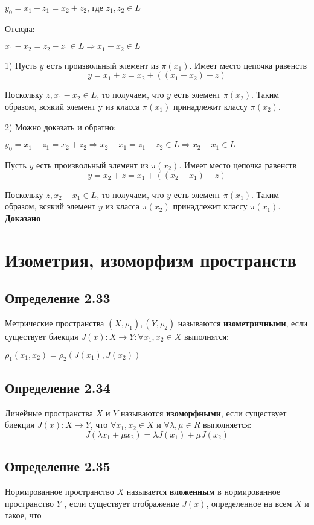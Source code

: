 \documentclass[12pt]{article}
\begin{document}
 	$y_0 = x_1 + z_1 = x_2 + z_2$, где $z_1, z_2 \in L$
 	
 	Отсюда:
 	
 	$x_1 - x_2 = z_2 - z_1 \in L	 \Rightarrow x_1 - x_2 \in L$
	
	 1) Пусть $y$ есть произвольный элемент из $\pi(x_1)$. Имеет место цепочка равенств
	  $$y = x_1 + z = x_2 + ((x_1 - x_2) + z) $$

Поскольку $z, x_1 - x_2 \in L$, то получаем, что $y$ есть элемент $\pi(x_2)$. 
Таким образом, всякий элемент y из класса $\pi(x_1)$ принадлежит классу $\pi(x_2)$.

	2) Можно доказать и обратно:

	$y_0 = x_1 + z_1 = x_2 + z_2 \Rightarrow x_2 - x_1 = z_1 - z_2 \in L	\Rightarrow x_2 - x_1 \in L$
	
		 Пусть $y$ есть произвольный элемент из $\pi(x_2)$. Имеет место цепочка равенств
	  $$y = x_2 + z = x_1 + ((x_2 - x_1) + z) $$
	
Поскольку $z, x_2 - x_1 \in L$, то получаем, что $y$ есть элемент $\pi(x_1)$. 
Таким образом, всякий элемент $y$ из класса $\pi(x_2)$ принадлежит классу $\pi(x_1)$.	
	\textbf{Доказано}
	
	
	
\newpage	
\section{Изометрия, изоморфизм пространств}

\subsection*{Определение 2.33}
	Метрические пространства $(X , \rho_1) , (Y , \rho_2)$ называются \textbf{изометричными}, если существует биекция  	
	$J(x) : X \to Y : \forall x_1,x_2 \in X$ выполнятся:
		
	$\rho_1(x_1,x_2) = \rho_2(J(x_1) , J(x_2))	$	



\subsection*{Определение 2.34}
Линейные пространства $X$ и $Y$ называются \textbf{изоморфными}, если
существует биекция $J(x) : X \to Y$, что $ \forall x_1, x_2 \in  X$ и $\forall \lambda , \mu \in R$ выполняется:
	$$J(\lambda x_1 + \mu x_2) = \lambda J(x_1) + \mu J(x_2)$$
	
	
\subsection{Определение 2.35}	
	Нормированное пространство $X$ называется \textbf{вложенным} в нормированное пространство $Y$ , если 			   	существует отображение $J(x)$,	
	определенное на всем $X$ и такое, что
\end{document}
